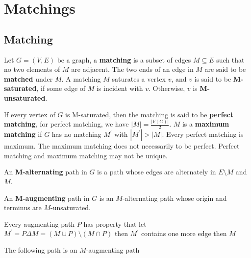 		\chapter{Matchings}
			\section{Matching}
				\begin{definition}
					Let $G = (V, E)$ be a graph, a \textbf{matching} is a subset of edges $M \subseteq E$ such that no two elements of $M$ are adjacent. The two ends of an edge in $M$ are said to be \textbf{matched} under $M$. A matching $M$ saturates a vertex $v$, and $v$ is said to be \textbf{M-saturated}, if some edge of $M$ is incident with $v$. Otherwise, $v$ is \textbf{M-unsaturated}.
				\end{definition}

				\begin{definition}
					If every vertex of $G$ is M-saturated, then the matching is said to be \textbf{perfect matching}, for perfect matching, we have $|M| = \frac{|V(G)|}{2}$. $M$ is a \textbf{maximum matching} if $G$ has no matching $M^\prime$ with $|M^\prime| > |M|$. Every perfect matching is maximum. The maximum matching does not necessarily to be perfect. Perfect matching and maximum matching may not be unique.
				\end{definition}

				\begin{definition}[M-alternating]
					An \textbf{M-alternating} path in $G$ is a path whose edges are alternately in $E\setminus M$ and $M$.
				\end{definition}

				\begin{definition}[M-augmenting]
					An \textbf{M-augmenting} path in $G$ is an $M$-alternating path whose origin and terminus are $M$-unsaturated.
				\end{definition}

				\begin{lemma}
					Every augmenting path $P$ has property that let $M^\prime = P\Delta M = (M \cup P) \setminus (M \cap P)$ then $M^\prime$ contains one more edge then $M$
				\end{lemma}

				The following path is an $M$-augmenting path
				\begin{figure}[!ht]
					\centering
				\end{figure}

